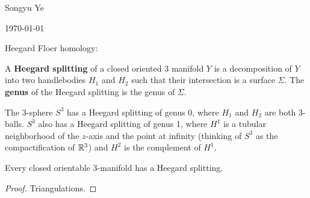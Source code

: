 \documentclass[12pt]{article}
\begin{document}
Songyu Ye

\today

\hfill

Heegard Floer homology:

\begin{definition}
    A \textbf{Heegard splitting} of a closed oriented 3 
    manifold $Y$ is a decomposition of $Y$ into two
    handlebodies $H_1$ and $H_2$ such that their
    intersection is a surface $\Sigma$. The \textbf{genus}
    of the Heegard splitting is the genus of $\Sigma$.
\end{definition}

\begin{example}
    The 3-sphere $S^3$ has a Heegard splitting of genus 0,
    where $H_1$ and $H_2$ are both 3-balls. $S^3$ also 
    has a Heegard splitting of genus 1, where $H^1$ is a tubular
    neighborhood of the $z$-axis and the point at infinity (thinking of $S^3$
    as the compactification of $\mathbb{R}^3$) and $H^2$ is the complement of $H^1$.
\end{example}


\begin{theorem}
    Every closed orientable 3-manifold has a Heegard splitting.
\end{theorem}

\begin{proof}
    Triangulations.
\end{proof}
\end{document}
